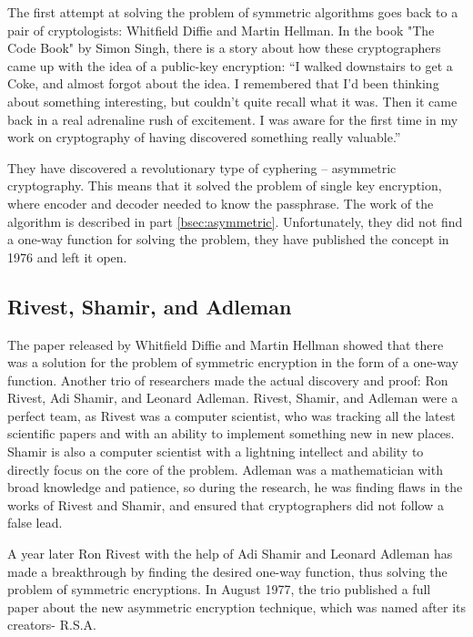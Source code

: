 \documentclass[a4paper, 12pt]{article}
\begin{document}
The first attempt at solving the problem of symmetric algorithms goes back to a pair of
cryptologists: Whitfield Diffie and Martin Hellman. In the book "The Code Book" by Simon
Singh, there is a story about how these cryptographers came up with the idea of a public-key
encryption: “I walked downstairs to get a Coke, and almost forgot about the idea. I remembered
that I'd been thinking about something interesting, but couldn't quite recall what it was. Then it
came back in a real adrenaline rush of excitement. I was aware for the first time in my work on
cryptography of having discovered something really valuable.” \cite{singh}

They have discovered a revolutionary type of cyphering – asymmetric cryptography. This means that it solved the problem of
single key encryption, where encoder and decoder needed to know the passphrase. The work of
the algorithm is described in part \ref{bsec:asymmetric}. Unfortunately, they did not find a one-way function for
solving the problem, they have published the concept in 1976 and left it open.

\subsection{Rivest, Shamir, and Adleman}
\label{bsec:rsa}

The paper released by Whitfield Diffie and Martin Hellman showed that there was a solution for
the problem of symmetric encryption in the form of a one-way function. Another trio of researchers
made the actual discovery and proof: Ron Rivest, Adi Shamir, and Leonard Adleman. Rivest,
Shamir, and Adleman were a perfect team, as Rivest was a computer scientist, who was tracking
all the latest scientific papers and with an ability to implement something new in new places.
Shamir is also a computer scientist with a lightning intellect and ability to directly focus on the
core of the problem. Adleman was a mathematician with broad knowledge and patience, so during
the research, he was finding flaws in the works of Rivest and Shamir, and ensured that
cryptographers did not follow a false lead.\cite{singh}

A year later Ron Rivest with the help of Adi Shamir
and Leonard Adleman has made a breakthrough by finding the desired one-way function, thus
solving the problem of symmetric encryptions. In August 1977, the trio published a full paper
about the new asymmetric encryption technique, which was named after its creators- R.S.A.\cite{rsapaper}
\end{document}
